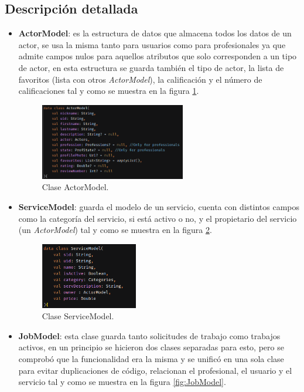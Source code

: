 \subsection{Descripción detallada}
\begin{itemize}
    \item \textbf{ActorModel}: es la estructura de datos que almacena todos los datos de un actor, se usa la misma tanto para usuarios como para profesionales ya que admite campos nulos para aquellos atributos que solo corresponden a un tipo de actor, en esta estructura se guarda también el tipo de actor, la lista de favoritos (lista con otros \textit{ActorModel}), la calificación y el número de calificaciones tal y como se muestra en la figura \ref{fig:actorModel}.
    \begin{figure}[h]
        \centering
        \includegraphics[width = 0.6\textwidth]{Imagenes/Fuentes/actorModel.png}
        \caption{Clase ActorModel.}
        \label{fig:actorModel}
    \end{figure}
    \item \textbf{ServiceModel}: guarda el modelo de un servicio, cuenta con distintos campos como la categoría del servicio, si está activo o no, y el propietario del servicio (un \textit{ActorModel}) tal y como se muestra en la figura \ref{fig:ServiceModel}.
    \begin{figure}[h]
        \centering
        \includegraphics[width = 0.4\textwidth]{Imagenes/Fuentes/ServiceModel.png}
        \caption{Clase ServiceModel.}
        \label{fig:ServiceModel}
    \end{figure}
    \item \textbf{JobModel}: esta clase guarda tanto solicitudes de trabajo como trabajos activos, en un principio se hicieron dos clases separadas para esto, pero se comprobó que la funcionalidad era la misma y se unificó en una sola clase para evitar duplicaciones de código, relacionan el profesional, el usuario y el servicio tal y como se muestra en la figura \ref{fig:JobModel}.

\end{itemize}
